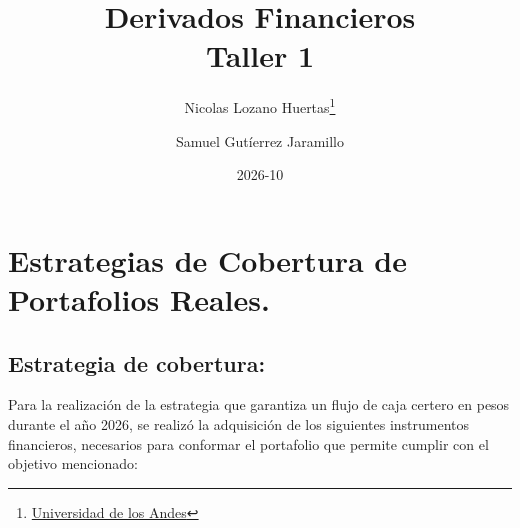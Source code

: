 \documentclass{article}
\title{\textbf{Derivados Financieros} \\ \textbf{Taller 1} }
\author{Nicolas Lozano Huertas\thanks{\href{mailto:n.lozanoh@uniandes.edu.co?subject= Taller 1 Derivados Financieros}{Universidad de los Andes}} \and Samuel Gut\'ierrez Jaramillo}
\date{2026-10}
\theoremstyle{remark}
\theoremstyle{definition}
\begin{document}
    \maketitle
    \vspace{-1 cm}
    \section{Estrategias de Cobertura de Portafolios Reales.}

    \subsection{Estrategia de cobertura:}

    Para la realización de la estrategia que garantiza un flujo de caja certero en pesos durante el año 2026, se realizó la adquisición de los siguientes instrumentos financieros, necesarios para conformar el portafolio que permite cumplir con el objetivo mencionado:
\end{document}
